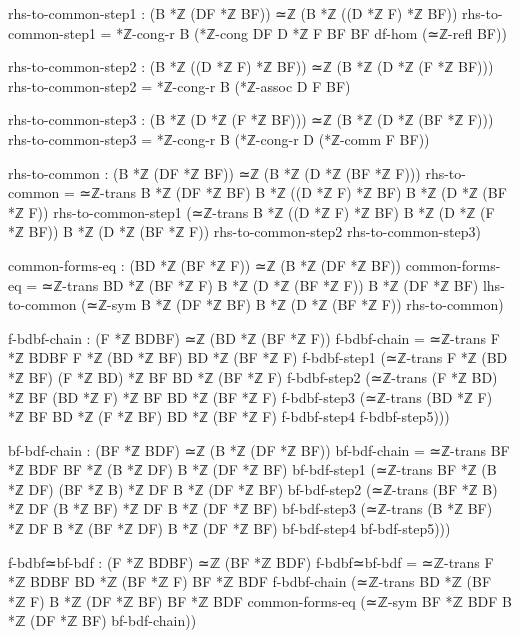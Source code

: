 \documentclass[11pt,a4paper]{book}
\begin{document}
\begin{code}
        rhs-to-common-step1 : (B *ℤ (DF *ℤ BF)) ≃ℤ (B *ℤ ((D *ℤ F) *ℤ BF))
        rhs-to-common-step1 = *ℤ-cong-r B (*ℤ-cong {DF} {D *ℤ F} {BF} {BF} df-hom (≃ℤ-refl BF))
        
        rhs-to-common-step2 : (B *ℤ ((D *ℤ F) *ℤ BF)) ≃ℤ (B *ℤ (D *ℤ (F *ℤ BF)))
        rhs-to-common-step2 = *ℤ-cong-r B (*ℤ-assoc D F BF)
        
        rhs-to-common-step3 : (B *ℤ (D *ℤ (F *ℤ BF))) ≃ℤ (B *ℤ (D *ℤ (BF *ℤ F)))
        rhs-to-common-step3 = *ℤ-cong-r B (*ℤ-cong-r D (*ℤ-comm F BF))
        
        rhs-to-common : (B *ℤ (DF *ℤ BF)) ≃ℤ (B *ℤ (D *ℤ (BF *ℤ F)))
        rhs-to-common = ≃ℤ-trans {B *ℤ (DF *ℤ BF)} {B *ℤ ((D *ℤ F) *ℤ BF)} {B *ℤ (D *ℤ (BF *ℤ F))}
                         rhs-to-common-step1
                         (≃ℤ-trans {B *ℤ ((D *ℤ F) *ℤ BF)} {B *ℤ (D *ℤ (F *ℤ BF))} {B *ℤ (D *ℤ (BF *ℤ F))}
                           rhs-to-common-step2 rhs-to-common-step3)

        common-forms-eq : (BD *ℤ (BF *ℤ F)) ≃ℤ (B *ℤ (DF *ℤ BF))
        common-forms-eq = ≃ℤ-trans {BD *ℤ (BF *ℤ F)} {B *ℤ (D *ℤ (BF *ℤ F))} {B *ℤ (DF *ℤ BF)}
                           lhs-to-common (≃ℤ-sym {B *ℤ (DF *ℤ BF)} {B *ℤ (D *ℤ (BF *ℤ F))} rhs-to-common)

        f-bdbf-chain : (F *ℤ BDBF) ≃ℤ (BD *ℤ (BF *ℤ F))
        f-bdbf-chain = ≃ℤ-trans {F *ℤ BDBF} {F *ℤ (BD *ℤ BF)} {BD *ℤ (BF *ℤ F)}
                        f-bdbf-step1
                        (≃ℤ-trans {F *ℤ (BD *ℤ BF)} {(F *ℤ BD) *ℤ BF} {BD *ℤ (BF *ℤ F)}
                          f-bdbf-step2
                          (≃ℤ-trans {(F *ℤ BD) *ℤ BF} {(BD *ℤ F) *ℤ BF} {BD *ℤ (BF *ℤ F)}
                            f-bdbf-step3
                            (≃ℤ-trans {(BD *ℤ F) *ℤ BF} {BD *ℤ (F *ℤ BF)} {BD *ℤ (BF *ℤ F)}
                              f-bdbf-step4 f-bdbf-step5)))

        bf-bdf-chain : (BF *ℤ BDF) ≃ℤ (B *ℤ (DF *ℤ BF))
        bf-bdf-chain = ≃ℤ-trans {BF *ℤ BDF} {BF *ℤ (B *ℤ DF)} {B *ℤ (DF *ℤ BF)}
                        bf-bdf-step1
                        (≃ℤ-trans {BF *ℤ (B *ℤ DF)} {(BF *ℤ B) *ℤ DF} {B *ℤ (DF *ℤ BF)}
                          bf-bdf-step2
                          (≃ℤ-trans {(BF *ℤ B) *ℤ DF} {(B *ℤ BF) *ℤ DF} {B *ℤ (DF *ℤ BF)}
                            bf-bdf-step3
                            (≃ℤ-trans {(B *ℤ BF) *ℤ DF} {B *ℤ (BF *ℤ DF)} {B *ℤ (DF *ℤ BF)}
                              bf-bdf-step4 bf-bdf-step5)))

        f-bdbf≃bf-bdf : (F *ℤ BDBF) ≃ℤ (BF *ℤ BDF)
        f-bdbf≃bf-bdf = ≃ℤ-trans {F *ℤ BDBF} {BD *ℤ (BF *ℤ F)} {BF *ℤ BDF}
                         f-bdbf-chain
                         (≃ℤ-trans {BD *ℤ (BF *ℤ F)} {B *ℤ (DF *ℤ BF)} {BF *ℤ BDF}
                           common-forms-eq
                           (≃ℤ-sym {BF *ℤ BDF} {B *ℤ (DF *ℤ BF)} bf-bdf-chain))


\end{code}
\end{document}
